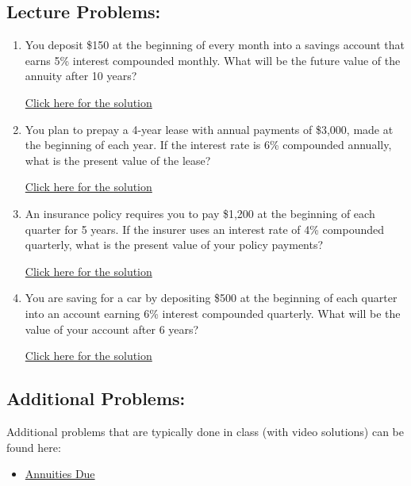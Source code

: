 \documentclass[
]{book}
\providecommand{\tightlist}{%
  \setlength{\itemsep}{0pt}\setlength{\parskip}{0pt}}
\begin{document}
\subsection*{Lecture Problems:}\label{lecture-problems-15}

\begin{enumerate}
\def\labelenumi{\arabic{enumi}.}
\tightlist
\item
  You deposit \$150 at the beginning of every month into a savings account that earns 5\% interest compounded monthly. What will be the future value of the annuity after 10 years?

  \href{https://youtu.be/2ZHW43unmi8}{Click here for the solution}
\item
  You plan to prepay a 4-year lease with annual payments of \$3,000, made at the beginning of each year. If the interest rate is 6\% compounded annually, what is the present value of the lease?

  \href{https://youtu.be/oiKuXhGN_RY}{Click here for the solution}
\item
  An insurance policy requires you to pay \$1,200 at the beginning of each quarter for 5 years. If the insurer uses an interest rate of 4\% compounded quarterly, what is the present value of your policy payments?

  \href{https://youtu.be/JplE47c91xU}{Click here for the solution}
\item
  You are saving for a car by depositing \$500 at the beginning of each quarter into an account earning 6\% interest compounded quarterly. What will be the value of your account after 6 years?

  \href{https://youtu.be/RydqSKjDjBg}{Click here for the solution}
\end{enumerate}

\subsection*{Additional Problems:}\label{additional-problems-15}

Additional problems that are typically done in class (with video solutions) can be found here:

\begin{itemize}
\tightlist
\item
  \href{https://theelementsmath.github.io/M114/more-on-annuities.html\#annuities-due}{Annuities Due}
\end{itemize}
\end{document}
